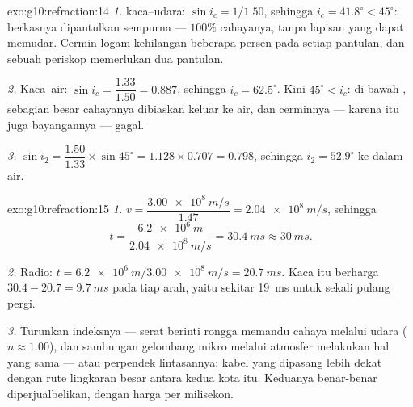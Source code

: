 \begin{solution}{exo:g10:refraction:14}
\emph{1.}  kaca--udara: $\sin i_c = 1/1.50$, sehingga
$i_c = 41.8^\circ < 45^\circ$: berkasnya dipantulkan sempurna ---
$100\%$ cahayanya, tanpa lapisan yang dapat memudar. Cermin logam
kehilangan beberapa persen pada setiap pantulan, dan sebuah periskop
memerlukan dua pantulan.

\emph{2.} Kaca--air: $\sin i_c = \dfrac{1.33}{1.50} = 0.887$, sehingga
$i_c = 62.5^\circ$. Kini $45^\circ < i_c$:  di bawah
, sebagian besar cahayanya dibiaskan keluar ke air, dan
cerminnya --- karena itu juga bayangannya --- gagal.

\emph{3.} $\sin i_2 = \dfrac{1.50}{1.33} \times \sin 45^\circ
= 1.128 \times 0.707 = 0.798$, sehingga $i_2 = 52.9^\circ$ ke dalam air.
\end{solution}

\begin{solution}{exo:g10:refraction:15}
\emph{1.} $v = \dfrac{\qty{3.00e8}{m/s}}{1.47} = \qty{2.04e8}{m/s}$,
sehingga
\[
t = \frac{\qty{6.2e6}{m}}{\qty{2.04e8}{m/s}} = \qty{30.4}{ms} \approx
\qty{30}{ms}.
\]

\emph{2.} Radio: $t = \qty{6.2e6}{m}/\qty{3.00e8}{m/s} =
\qty{20.7}{ms}$. Kaca itu berharga $30.4 - 20.7 = \qty{9.7}{ms}$ pada
tiap arah, yaitu sekitar \qty{19}{ms} untuk sekali pulang pergi.

\emph{3.} Turunkan indeksnya --- serat berinti rongga memandu cahaya
melalui udara ($n \approx 1.00$), dan sambungan gelombang mikro melalui
atmosfer melakukan hal yang sama --- atau perpendek lintasannya: kabel
yang dipasang lebih dekat dengan rute lingkaran besar antara kedua kota
itu. Keduanya benar-benar diperjualbelikan, dengan harga per milisekon.
\end{solution}

